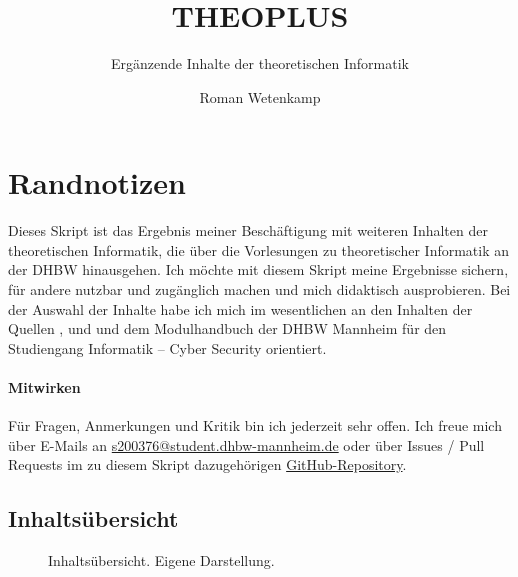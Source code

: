\documentclass[11pt,a4paper]{scrreport}
\title{THEOPLUS}
\subtitle{Ergänzende Inhalte der theoretischen Informatik}
\author{Roman Wetenkamp}
\theoremstyle{remark}
\theoremstyle{custom}
\begin{document}
\maketitle

\section*{Randnotizen}
Dieses Skript ist das Ergebnis meiner Beschäftigung mit weiteren Inhalten der theoretischen Informatik, die über die Vorlesungen zu theoretischer Informatik an der DHBW hinausgehen. Ich möchte mit diesem Skript meine Ergebnisse sichern, für andere nutzbar und zugänglich machen und mich didaktisch ausprobieren. Bei der Auswahl der Inhalte habe ich mich im wesentlichen an den Inhalten der Quellen \parencite{Hopcroft}, \parencite{Sipser} und \parencite{Ben-Ari} und dem Modulhandbuch der DHBW Mannheim für den Studiengang {\glqq}Informatik -- Cyber Security{\grqq} orientiert. 
\paragraph{Mitwirken} Für Fragen, Anmerkungen und Kritik bin ich jederzeit sehr offen. Ich freue mich über E-Mails an \href{mailto:s200376@student.dhbw-mannheim.de}{s200376@student.dhbw-mannheim.de} oder über Issues / Pull Requests im zu diesem Skript dazugehörigen \href{https://www.github.com/RWetenkamp/theoplus}{GitHub-Repository}.
\subsection*{Inhaltsübersicht}
\begin{figure}[h!]
\centering
{}
\caption{Inhaltsübersicht. Eigene Darstellung.}
\end{figure}
\pagebreak
\tableofcontents
\pagebreak
\end{document}
